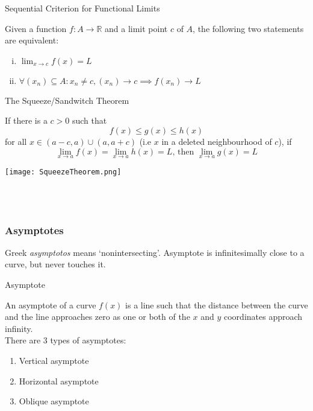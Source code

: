 \begin{theorem}{Sequential Criterion for Functional Limits}
    
    Given a function $f:A \to \mathbb{R}$ and a limit point $c$ of $A$, the following two statements are equivalent:
    \begin{enumerate}[(i)]
        \item $\lim_{x \to c} f(x) = L$ 
        \item $\forall(x_n)\subseteq A : x_n \neq c, (x_n)\to c \implies f(x_n) \to L$
    \end{enumerate}
\end{theorem}

\begin{theorem}{The Squeeze/Sandwitch Theorem}
   
    If there is a $c>0$ such that \[
        f(x)\le g(x)\le h(x)
    \] for all $x\in(a-c,a)\cup(a,a+c)$ (i.e $x$ in a deleted neighbourhood of $c$), if \[
        \lim_{x \to a} f(x) = \lim_{x \to a} h(x) = L \text{, then } \lim_{x \to a} g(x) = L
    \]
    \begin{center}
        \texttt{[image: SqueezeTheorem.png]}
    \end{center}
\end{theorem} \\~\\



\subsubsection{Asymptotes}
Greek \textit{asymptotos} means `nonintersecting'. Asymptote is infinitesimally close to a curve, but never touches it.

\begin{definition}{Asymptote}

    An asymptote of a curve $f(x)$ is a line such that the distance between the curve and the line approaches zero as one or both of the $x$ and $y$ coordinates approach infinity. \\
    There are 3 types of asymptotes:
    \begin{enumerate}
        \item Vertical asymptote
        \item Horizontal asymptote
        \item Oblique asymptote
    \end{enumerate}
\end{definition}

